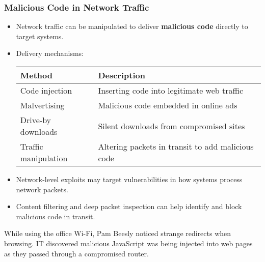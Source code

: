 \documentclass{beamer}
\begin{document}
\begin{frame}
    \frametitle{Malicious Code in Network Traffic}
    
    \begin{itemize}
        \item Network traffic can be manipulated to deliver \textbf{malicious code} directly to target systems.
        \item Delivery mechanisms:
        
        \begin{tabular}{l|l}
            \textbf{Method} & \textbf{Description} \\
            \hline
            Code injection & Inserting code into legitimate web traffic \\
            Malvertising & Malicious code embedded in online ads \\
            Drive-by downloads & Silent downloads from compromised sites \\
            Traffic manipulation & Altering packets in transit to add malicious code \\
        \end{tabular}
        
        \item Network-level exploits may target vulnerabilities in how systems process network packets.
        \item Content filtering and deep packet inspection can help identify and block malicious code in transit.
    \end{itemize}
    
    \begin{example}
        While using the office Wi-Fi, Pam Beesly noticed strange redirects when browsing. IT discovered malicious JavaScript was being injected into web pages as they passed through a compromised router.
    \end{example}
\end{frame}
\end{document}
